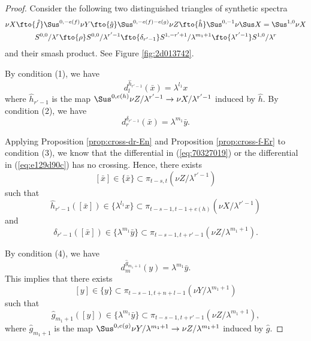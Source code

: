 \documentclass{amsart}
\numberwithin{equation}{section}
\begin{document}
\begin{proof}
    Consider the following two distinguished triangles of synthetic spectra
    \begin{gather*}
        \nu X\fto{\hat f} \Sus^{0,-e(f)}\nu Y\fto{\hat g} \Sus^{0,-e(f)-e(g)}\nu Z\fto{\hat h} \Sus^{0,-1}\nu \Sus X=\Sus^{1,0}\nu X\\
        S^{0,0}/\lambda^{r}\fto{\rho} S^{0,0}/\lambda^{r'-1} \fto{\delta_{r'-1}} S^{1,-r'+1}/\lambda^{m_1+1} \fto{\lambda^{r'-1}} S^{1,0}/\lambda^{r}
    \end{gather*}
    and their smash product. See Figure \ref{fig:2d013742}.

    By condition (1), we have
    \begin{equation}\label{eq:70327019}
        d^{\hat h_{r'-1}}_l(\bar x)=\lambda^{l_1}x
    \end{equation}
    where $\hat h_{r'-1}$ is the map $\Sus^{0,e(h)}\nu Z/\lambda^{r'-1}\to \nu X/\lambda^{r'-1}$ induced by $\hat h$.
    By condition (2), we have
    \begin{equation}\label{eq:e129d90c}
        d^{\delta_{r'-1}}_r(\bar x)=\lambda^{m_1}\bar y.
    \end{equation}
 
    
    Applying Proposition \ref{prop:cross-dr-En} and Proposition \ref{prop:cross-f-Er} to condition (3), we know that the differential in (\ref{eq:70327019}) or the differential in (\ref{eq:e129d90c}) has no crossing. Hence, there exists
    $$[\bar x]\in \{\bar x\}\subset \pi_{t-s,t}(\nu Z/\lambda^{r'-1})$$
    such that
    $$\hat h_{r'-1}([\bar x])\in \{\lambda^{l_1}x\}\subset \pi_{t-s-1, t-1+e(h)}(\nu X/\lambda^{r'-1})$$
    and
    $$\delta_{r'-1}([\bar x])\in \{\lambda^{m_1}\bar y\}\subset \pi_{t-s-1,t+r'-1}(\nu Z/\lambda^{m_1+1}).$$

    By condition (4), we have
    \begin{equation*}
        d^{\hat g_{m_1+1}}_m(y)=\lambda^{m_1}\bar y.
    \end{equation*}
    This implies that there exists
    $$[y]\in \{y\}\subset \pi_{t-s-1,t+n+l-1}(\nu Y/\lambda^{m_1+1})$$
    such that
    $$\hat g_{m_1+1}([y])\in \{\lambda^{m_1}\bar y\}\subset \pi_{t-s-1, t+r'-1}(\nu Z/\lambda^{m_1+1}),$$
    where $\hat g_{m_1+1}$ is the map $\Sus^{0,e(g)}\nu Y/\lambda^{m_1+1}\to \nu Z/\lambda^{m_1+1}$ induced by $\hat g$.
    

\end{proof}
\end{document}
